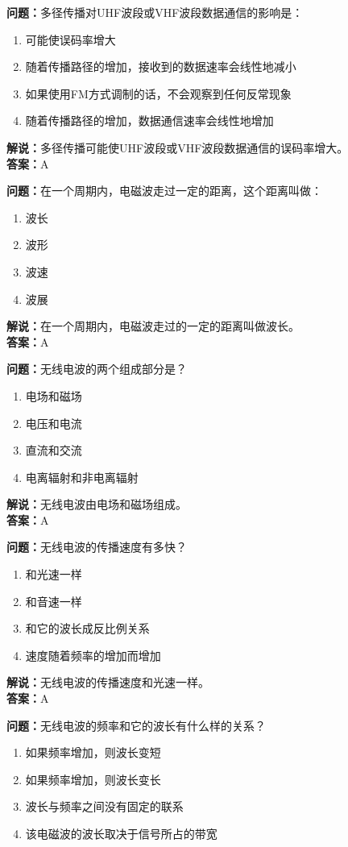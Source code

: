 \documentclass[UTF8]{ctexbook}
\begin{document}
\textbf{问题：}多径传播对UHF波段或VHF波段数据通信的影响是：
\begin{enumerate}[label=\Alph*), leftmargin=3em]
  \item 可能使误码率增大
  \item 随着传播路径的增加，接收到的数据速率会线性地减小
  \item 如果使用FM方式调制的话，不会观察到任何反常现象
  \item 随着传播路径的增加，数据通信速率会线性地增加
\end{enumerate}
\textbf{解说：}多径传播可能使UHF波段或VHF波段数据通信的误码率增大。\\
\textbf{答案：}A

\textbf{问题：}在一个周期内，电磁波走过一定的距离，这个距离叫做：
\begin{enumerate}[label=\Alph*), leftmargin=3em]
  \item 波长
  \item 波形
  \item 波速
  \item 波展
\end{enumerate}
\textbf{解说：}在一个周期内，电磁波走过的一定的距离叫做波长。\\
\textbf{答案：}A

\textbf{问题：}无线电波的两个组成部分是？
\begin{enumerate}[label=\Alph*), leftmargin=3em]
  \item 电场和磁场
  \item 电压和电流
  \item 直流和交流
  \item 电离辐射和非电离辐射
\end{enumerate}
\textbf{解说：}无线电波由电场和磁场组成。\\
\textbf{答案：}A

\textbf{问题：}无线电波的传播速度有多快？
\begin{enumerate}[label=\Alph*), leftmargin=3em]
  \item 和光速一样
  \item 和音速一样
  \item 和它的波长成反比例关系
  \item 速度随着频率的增加而增加
\end{enumerate}
\textbf{解说：}无线电波的传播速度和光速一样。\\
\textbf{答案：}A

\textbf{问题：}无线电波的频率和它的波长有什么样的关系？
\begin{enumerate}[label=\Alph*), leftmargin=3em]
  \item 如果频率增加，则波长变短
  \item 如果频率增加，则波长变长
  \item 波长与频率之间没有固定的联系
  \item 该电磁波的波长取决于信号所占的带宽
\end{enumerate}
\end{document}
